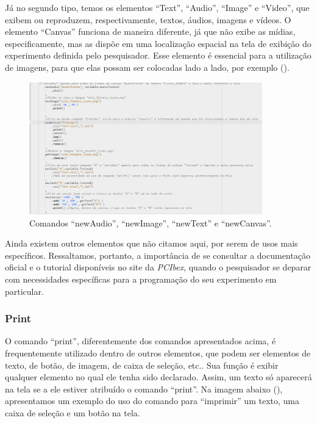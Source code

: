 \documentclass{textolivre}
\begin{document}
Já no segundo tipo, temos os elementos “Text”, “Audio”, “Image” e “Video”, que exibem ou reproduzem, respectivamente, textos, áudios, imagens e vídeos. O elemento “Canvas” funciona de maneira diferente, já que não exibe as mídias, especificamente, mas as dispõe em uma localização espacial na tela de exibição do experimento definida pelo pesquisador. Esse elemento é essencial para a utilização de imagens, para que elas possam ser colocadas lado a lado, por exemplo ().

\begin{figure}[htbp]
 \centering
 \includegraphics[width=0.9\textwidth]{fig-014.png}
 \caption{Comandos “newAudio”, “newImage”, “newText” e “newCanvas”.}
 \label{fig14}
\end{figure}

Ainda existem outros elementos que não citamos aqui, por serem de usos mais específicos. Ressaltamos, portanto, a importância de se consultar a documentação oficial e o tutorial disponíveis no site da \emph{PCIbex}, quando o pesquisador se deparar com necessidades específicas para a programação do seu experimento em particular.

\subsubsection{Print}
O comando “print”, diferentemente dos comandos apresentados acima, é frequentemente utilizado dentro de outros elementos, que podem ser elementos de texto, de botão, de imagem, de caixa de seleção, etc.. Sua função é exibir qualquer elemento no qual ele tenha sido declarado. Assim, um texto só aparecerá na tela se a ele estiver atribuído o comando “print”. Na imagem abaixo (), apresentamos um exemplo do uso do comando para “imprimir” um texto, uma caixa de seleção e um botão na tela.
\end{document}
